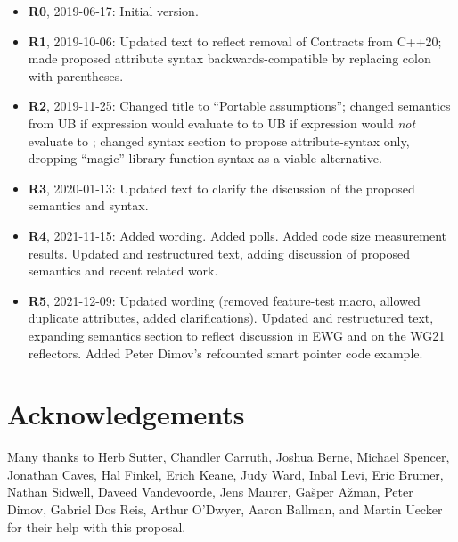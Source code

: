 \begin{itemize}
\item \textbf{R0}, 2019-06-17: Initial version.
\item \textbf{R1}, 2019-10-06: Updated text to reflect removal of Contracts from C++20; made proposed attribute syntax backwards-compatible by replacing colon with parentheses.
\item \textbf{R2}, 2019-11-25: Changed title to ``Portable assumptions''; changed semantics from UB if expression would evaluate to  to UB if expression would \emph{not} evaluate to ; changed syntax section to propose attribute-syntax only, dropping ``magic'' library function syntax as a viable alternative.
\item \textbf {R3}, 2020-01-13: Updated text to clarify the discussion of the proposed semantics and syntax.
\item \textbf{R4}, 2021-11-15:  Added wording. Added polls. Added code size measurement results. Updated and restructured text, adding discussion of proposed semantics and recent related work.
\item \textbf{R5}, 2021-12-09: Updated wording (removed feature-test macro, allowed duplicate attributes, added clarifications). Updated and restructured text, expanding semantics section to reflect discussion in EWG and on the WG21 reflectors. Added Peter Dimov's refcounted smart pointer code example.
\end{itemize}

\section*{Acknowledgements}

Many thanks to Herb Sutter, Chandler Carruth, Joshua Berne, Michael Spencer, Jonathan Caves, Hal Finkel, Erich Keane, Judy Ward, Inbal Levi, Eric Brumer, Nathan Sidwell, Daveed Vandevoorde, Jens Maurer, Ga\v sper A\v zman, Peter Dimov, Gabriel Dos Reis, Arthur O'Dwyer, Aaron Ballman, and Martin Uecker for their help with this proposal.

\renewcommand{\bibname}{References}



